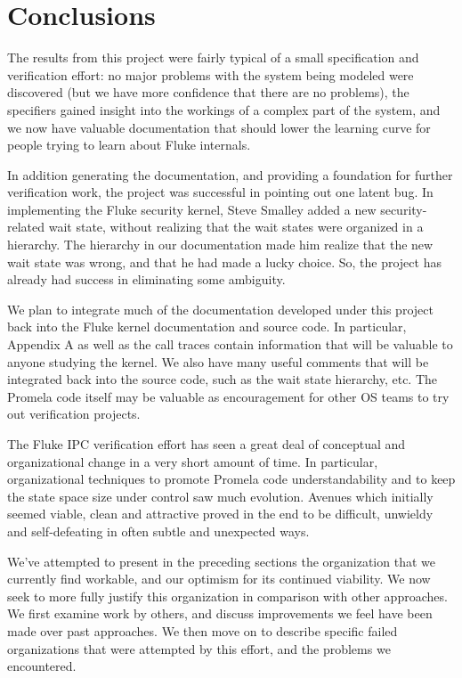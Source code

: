 
\section{Conclusions}
\label{conclusions}

The results from this project were fairly typical of a small
specification and verification effort: no major problems with the
system being modeled were discovered (but we have more confidence that
there are no problems), the specifiers gained insight into the
workings of a complex part of the system, and we now have valuable
documentation that should lower the learning curve for people trying
to learn about Fluke internals.

In addition generating the documentation, and providing a foundation
for further verification work, the project was successful in pointing
out one latent bug.  In implementing the Fluke security kernel, Steve
Smalley added a new security-related wait state, without realizing
that the wait states were organized in a hierarchy.  The hierarchy in
our documentation made him realize that the new wait state was wrong,
and that he had made a lucky choice.  So, the project has already had
success in eliminating some ambiguity.

We plan to integrate much of the documentation developed under this
project back into the Fluke kernel documentation and source code.  In
particular, Appendix A as well as the call traces contain information
that will be valuable to anyone studying the kernel.  We also have
many useful comments that will be integrated back into the source
code, such as the wait state hierarchy, etc.  The Promela code itself
may be valuable as encouragement for other OS teams to try out
verification projects.

The Fluke IPC verification effort has seen a great deal of conceptual
and organizational change in a very short amount of time.  In particular,
organizational techniques to promote Promela code understandability and
to keep the state space size under control saw much evolution.  Avenues
which initially seemed viable, clean and attractive proved in the end
to be difficult, unwieldy and self-defeating in often subtle and
unexpected ways.

We've attempted to present in the preceding sections the organization
that we currently find workable, and our optimism for its continued
viability.  We now seek to more fully justify this organization in
comparison with other approaches.  We first examine work by others,
and discuss improvements we feel have been made over past approaches.
We then move on to describe specific failed organizations that were
attempted by this effort, and the problems we encountered.


